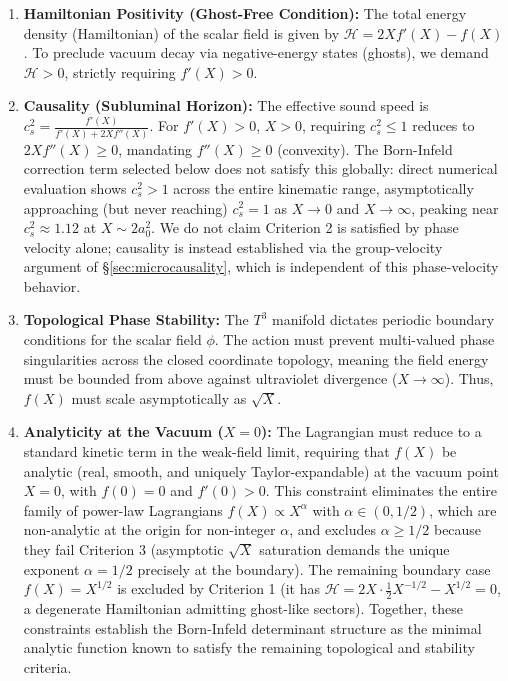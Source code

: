 \documentclass[aps,prd,10pt,twocolumn,superscriptaddress,nofootinbib,floatfix]{revtex4-2}
\begin{document}
\begin{enumerate}
    \item \textbf{Hamiltonian Positivity (Ghost-Free Condition):} The total energy density (Hamiltonian) of the scalar field is given by $\mathcal{H} = 2X f'(X) - f(X)$. To preclude vacuum decay via negative-energy states (ghosts), we demand $\mathcal{H} > 0$, strictly requiring $f'(X) > 0$.
    \item \textbf{Causality (Subluminal Horizon):} The effective sound speed is $c_s^2 = \frac{f'(X)}{f'(X) + 2X f''(X)}$. For $f'(X)>0$, $X>0$, requiring $c_s^2 \le 1$ reduces to $2Xf''(X) \ge 0$, mandating $f''(X) \ge 0$ (convexity). The Born-Infeld correction term selected below does not satisfy this globally: direct numerical evaluation shows $c_s^2 > 1$ across the entire kinematic range, asymptotically approaching (but never reaching) $c_s^2=1$ as $X \to 0$ and $X \to \infty$, peaking near $c_s^2 \approx 1.12$ at $X \sim 2a_0^2$. We do not claim Criterion 2 is satisfied by phase velocity alone; causality is instead established via the group-velocity argument of \S\ref{sec:microcausality}, which is independent of this phase-velocity behavior.
    \item \textbf{Topological Phase Stability:} The $T^3$ manifold dictates periodic boundary conditions for the scalar field $\phi$. The action must prevent multi-valued phase singularities across the closed coordinate topology, meaning the field energy must be bounded from above against ultraviolet divergence ($X \to \infty$). Thus, $f(X)$ must scale asymptotically as $\sqrt{X}$.
    \item \textbf{Analyticity at the Vacuum ($X = 0$):} The Lagrangian must reduce to a standard kinetic term in the weak-field limit, requiring that $f(X)$ be analytic (real, smooth, and uniquely Taylor-expandable) at the vacuum point $X = 0$, with $f(0) = 0$ and $f'(0) > 0$. This constraint eliminates the entire family of power-law Lagrangians $f(X) \propto X^\alpha$ with $\alpha \in (0, 1/2)$, which are non-analytic at the origin for non-integer $\alpha$, and excludes $\alpha \ge 1/2$ because they fail Criterion 3 (asymptotic $\sqrt{X}$ saturation demands the unique exponent $\alpha = 1/2$ precisely at the boundary). The remaining boundary case $f(X) = X^{1/2}$ is excluded by Criterion 1 (it has $\mathcal{H} = 2X \cdot \frac{1}{2} X^{-1/2} - X^{1/2} = 0$, a degenerate Hamiltonian admitting ghost-like sectors). Together, these constraints establish the Born-Infeld determinant structure as the minimal analytic function known to satisfy the remaining topological and stability criteria.
\end{enumerate}
\end{document}
